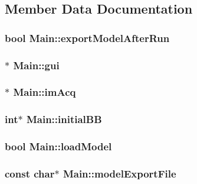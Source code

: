 \subsection{Member Data Documentation}
\hypertarget{class_main_a9a760d7b7e2dc8dc9bdaa027a86da734}{
\subsubsection[{exportModelAfterRun}]{\setlength{\rightskip}{0pt plus 5cm}bool {\bf Main::exportModelAfterRun}}}
\label{class_main_a9a760d7b7e2dc8dc9bdaa027a86da734}
\hypertarget{class_main_a56afdbd63fd6e0f92ed2113ad53cc8df}{
\subsubsection[{gui}]{$\ast$ {\bf Main::gui}}}
\label{class_main_a56afdbd63fd6e0f92ed2113ad53cc8df}
\hypertarget{class_main_a37f97b28ea0f64421b5a0bb590059321}{
\subsubsection[{imAcq}]{$\ast$ {\bf Main::imAcq}}}
\label{class_main_a37f97b28ea0f64421b5a0bb590059321}
\hypertarget{class_main_a0f8b49ea51db0779192fb254c5e31e22}{
\subsubsection[{initialBB}]{\setlength{\rightskip}{0pt plus 5cm}int$\ast$ {\bf Main::initialBB}}}
\label{class_main_a0f8b49ea51db0779192fb254c5e31e22}
\hypertarget{class_main_ad0301eff91ba4a68e41e28f238f5a743}{
\subsubsection[{loadModel}]{\setlength{\rightskip}{0pt plus 5cm}bool {\bf Main::loadModel}}}
\label{class_main_ad0301eff91ba4a68e41e28f238f5a743}
\hypertarget{class_main_a3003ab9835173ebf15939e4b97143615}{
\subsubsection[{modelExportFile}]{\setlength{\rightskip}{0pt plus 5cm}const char$\ast$ {\bf Main::modelExportFile}}}
